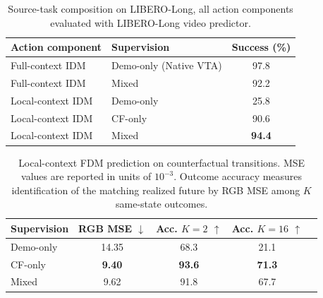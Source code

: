 \begin{table}[!t]
    \centering
    \caption{
    Source-task composition on LIBERO-Long, all action components evaluated with LIBERO-Long video
    predictor.
    }
    \label{tab:component-source}
    \footnotesize
    \begin{tabular}{@{}llc@{}}
        \toprule
        \textbf{Action component}
        & \textbf{Supervision}
        & \textbf{Success (\%)} \\
        \midrule

        Full-context IDM
        & Demo-only (Native VTA)
        & 97.8 \\

        Full-context IDM
        & Mixed
        & 92.2 \\

        \midrule

        Local-context IDM
        & Demo-only
        & 25.8 \\

        Local-context IDM
        & CF-only
        & 90.6 \\

        Local-context IDM
        & Mixed
        & \textbf{94.4} \\

        \bottomrule
    \end{tabular}
\end{table}

\begin{table}[t]
    \centering
    \caption{
    Local-context FDM prediction on counterfactual transitions.
    MSE values are reported in units of $10^{-3}$.
    Outcome accuracy measures identification of the matching realized future
    by RGB MSE among $K$ same-state outcomes.
    }
    \label{tab:fdm}
    \small
    \begin{tabular}{@{}lcccc@{}}
        \toprule
        \textbf{Supervision}
        & \textbf{RGB MSE $\downarrow$}
        & \textbf{Acc.} $K{=}2$ $\uparrow$
        & \textbf{Acc.} $K{=}16$ $\uparrow$ \\
        \midrule
        Demo-only
        & 14.35
        & 68.3
        & 21.1 \\
        CF-only
        & \textbf{9.40}
        & \textbf{93.6}
        & \textbf{71.3} \\
        Mixed
        & 9.62
        & 91.8
        & 67.7 \\
        \bottomrule
    \end{tabular}
    \vspace{-0.2in}
\end{table}


